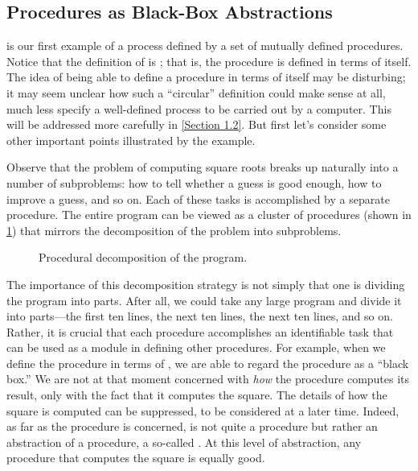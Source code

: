 \subsection{Procedures as Black-Box Abstractions}
\label{Section 1.1.8}

 is our first example of a process defined by a set of mutually defined procedures.
Notice that the definition of  is ;
that is, the procedure is defined in terms of itself.
The idea of being able to define a procedure in terms of itself may be disturbing;
it may seem unclear how such a “circular” definition could make sense at all, much less specify a well-defined process to be carried out by a computer.
This will be addressed more carefully in \cref{Section 1.2}.
But first let’s consider some other important points illustrated by the  example.

Observe that the problem of computing square roots breaks up naturally into a number of subproblems:
how to tell whether a guess is good enough, how to improve a guess, and so on.
Each of these tasks is accomplished by a separate procedure.
The entire  program can be viewed as a cluster of procedures (shown in \cref{Figure 1.2}) that mirrors the decomposition of the problem into subproblems.

\begin{figure}[tb]
	\centering
	
	\caption{
		Procedural decomposition of the  program.
	}
	\label{Figure 1.2}
\end{figure}

The importance of this decomposition strategy is not simply that one is dividing the program into parts.
After all, we could take any large program and divide it into parts---the first ten lines, the next ten lines, the next ten lines, and so on.
Rather, it is crucial that each procedure accomplishes an identifiable task that can be used as a module in defining other procedures.
For example, when we define the  procedure in terms of , we are able to regard the  procedure as a “black box.”
We are not at that moment concerned with \emph{how} the procedure computes its result, only with the fact that it computes the square.
The details of how the square is computed can be suppressed, to be considered at a later time.
Indeed, as far as the  procedure is concerned,  is not quite a procedure but rather an abstraction of a procedure, a so-called .
At this level of abstraction, any procedure that computes the square is equally good.

